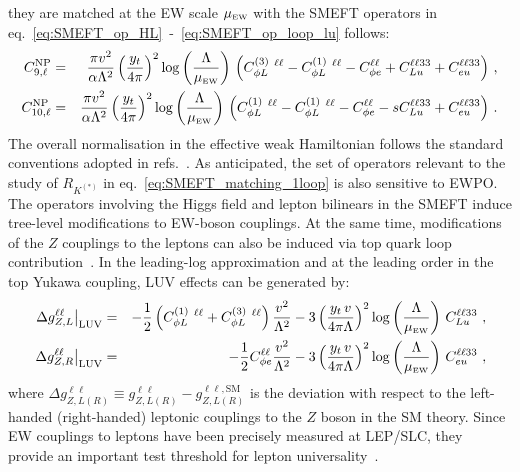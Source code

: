  they are matched at the EW scale $\mu_{\textrm{\tiny{EW}}}$  with the SMEFT operators in  eq.~\eqref{eq:SMEFT_op_HL}~-~\eqref{eq:SMEFT_op_loop_lu} follows:
\begin{eqnarray} 
	\label{eq:_C9_C10}
	C_{9,\ell}^{\rm NP}&=& \frac{\pi v^{2}}{\alpha \Lambda^2} \left(\frac{y_{t} }{4 \pi}\right)^2 \log \left( \frac{\Lambda}{\mu_{\textrm{\tiny{EW}}}} \right)   \, \left(C_{\phi L}^{(3)}\ ^{\ell \ell}-C_{\phi L}^{(1)}\ ^{\ell \ell}-C^{\ell \ell}_{\phi e}+ C_{Lu}^{\ell \ell 3 3} + C_{eu}^{\ell \ell 3 3} \right)\,,\nonumber \\
	C_{10,\ell}^{\rm NP}&=& \frac{\pi v^{2}}{\alpha \Lambda^2} \left(\frac{y_{t} }{4 \pi}\right)^2 \log \left( \frac{\Lambda}{\mu_{\textrm{\tiny{EW}}}} \right)   \, \left(C_{\phi L}^{(1)}\ ^{\ell \ell}-C_{\phi L}^{(1)}\ ^{\ell \ell}-C^{\ell \ell}_{\phi e}-s C_{Lu}^{\ell \ell 3 3} + C_{eu}^{\ell \ell 3 3} \right)\, .
\end{eqnarray} 
The overall normalisation in the effective weak Hamiltonian follows the standard conventions adopted in refs.~\cite{Ciuchini:2015qxb,Ciuchini:2017mik,Ciuchini:2019usw}.
As anticipated, the set of operators relevant to the study of $R_{K^{(*)}}$ in eq.~\eqref{eq:SMEFT_matching_1loop} is also sensitive to EWPO.  The operators involving the Higgs field and lepton bilinears in the SMEFT induce tree-level modifications to EW-boson couplings. At the same time, modifications of the $Z$ couplings to the leptons can also be induced via top quark loop
contribution~\cite{deBlas:2015aea}. In the leading-log approximation and at the leading order in the top Yukawa coupling, LUV effects can be generated by:
%
\begin{eqnarray}
	\label{eq:OLuedRGE}
	\left.\Delta g_{Z,L}^{\ell\ell}\right|_{\mathrm{LUV}} & = &
	- \frac 12 \left( C_{\phi L}^{(1)}\ ^{\ell \ell} +C_{\phi L}^{(3)}\ ^{\ell \ell} \right)\frac{v^2}{\Lambda^2}-
	3 \left( \frac{ y_t \, v}{4 \pi \Lambda} \right)^2 \log\left(\frac{\Lambda}{\mu_{\textrm{\tiny{EW}}}} \right) \, C_{Lu}^{\ell\ell33}  \ , \\ \nonumber
	\left.\Delta g_{Z,R}^{\ell\ell}\right|_{\mathrm{LUV}} & = & 
	- \frac 12 C^{\ell\ell}_{\phi e}\frac{v^2}{\Lambda^2}-
	3 \left( \frac{ y_t \, v}{4 \pi \Lambda} \right)^2 \log\left(\frac{\Lambda }{\mu_{\textrm{\tiny{EW}}}}\right) \, C_{eu}^{\ell\ell33} \ ,
\end{eqnarray}
where $\Delta g_{Z,L (R)}^{\ell\ell} \equiv g_{Z,L(R)}^{\ell\ell} - g_{Z,L (R)}^{\ell\ell,\textrm{SM}}$ is the deviation with respect to the left-handed (right-handed) leptonic couplings to the $Z$ boson in the SM theory. Since EW couplings to leptons have been precisely measured at LEP/SLC, they provide an important test threshold for lepton universality~\cite{Efrati:2015eaa,deBlas:2016ojx}.\\

